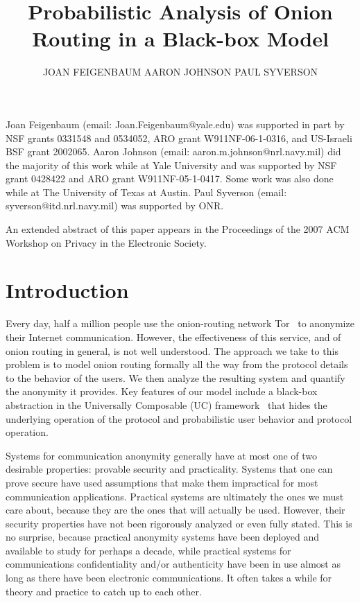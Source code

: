 \documentclass[prodmode,acmtissec]{acmsmall}
\title{Probabilistic Analysis of Onion Routing in a Black-box Model}
\author{JOAN FEIGENBAUM \affil{Yale University} AARON JOHNSON
  \affil{U.S. Naval Research Laboratory} PAUL SYVERSON \affil{U.S. Naval
    Research Laboratory}
}
\begin{document}
\begin{bottomstuff}
Joan Feigenbaum (email: Joan.Feigenbaum@yale.edu) was supported in part by NSF grants 0331548 and 0534052, ARO grant W911NF-06-1-0316, and US-Israeli BSF grant 2002065.
Aaron Johnson (email: aaron.m.johnson@nrl.navy.mil) did the majority of this work while at Yale University and was supported by NSF grant 0428422 and ARO grant W911NF-05-1-0417. Some work was also done while at The University of Texas at Austin. 
Paul Syverson (email: syverson@itd.nrl.navy.mil) was supported by ONR.

An extended abstract of this paper appears in the Proceedings of the 2007 ACM Workshop on Privacy in the Electronic Society.
\end{bottomstuff}
\maketitle

\section{Introduction}
Every day, half a million people use the onion-routing network Tor~\cite{tor-design} to anonymize their Internet communication.  However, the effectiveness of this service, and of onion routing in general, is not well understood.  The approach we take to this problem is to model onion routing formally all the way from the protocol details to the behavior of the users.  We then analyze the resulting system and quantify the anonymity it provides.  Key features of our model include  a black-box abstraction in the Universally Composable (UC) framework~\cite{cryptoeprint:2000:067} that hides the underlying operation of the protocol and  probabilistic user behavior and protocol operation.


Systems for communication anonymity generally have at most one of two desirable properties: provable security and practicality.  Systems that one can prove secure have used assumptions that make them impractical for most communication applications.  Practical systems are ultimately the ones we must care about, because they are the ones that will actually be used. However, their security properties have not been rigorously analyzed or even fully stated. This is no surprise, because practical anonymity systems have been deployed and available to study for perhaps a decade, while practical systems for communications confidentiality and/or authenticity have been in use almost as long as there have been electronic communications. It often takes a while for theory and practice to catch up to each other.
\end{document}
